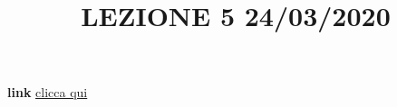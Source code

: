 \title{LEZIONE 5 24/03/2020}\newline
\textbf{link} \href{https://web.microsoftstream.com/video/ddba4e0e-486c-4e25-9074-9749fa6a08f5?list=user&userId=8750338c-1a15-456b-9dc7-11c7358842b4}{clicca qui}
\section{}